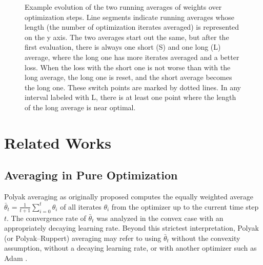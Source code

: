 \documentclass[twocolumn]{article}
\begin{document}
\begin{figure}
\centering
{}
\caption[Example evolution of the two running averages of weights over optimization steps.]{Example evolution of the two running averages of weights over optimization steps.
Line segments indicate running averages whose length (the number of optimization iterates averaged) is represented on the y axis.
The two averages start out the same, but after the first evaluation, there is always one short (S) and one long (L) average, where the long one has more iterates averaged and a better loss.
When the loss with the short one is not worse than with the long average, the long one is reset, and the short average becomes the long one.
These switch points are marked by dotted lines.
In any interval labeled with L, there is at least one point where the length of the long average is near optimal.}
\label{fig:schematic}
\end{figure}


\section{Related Works}

\subsection{Averaging in Pure Optimization}

Polyak averaging as originally proposed \citep{ruppert1988efficient,polyak1992acceleration} computes the equally weighted average
$\bar{\theta}_t = \frac{1}{t+1}\sum_{i=0}^{t}\theta_i$
of all iterates $\theta_i$ from the optimizer up to the current time step $t$.
The convergence rate of $\bar{\theta}_t$ was analyzed in the convex case with an appropriately decaying learning rate.
Beyond this strictest interpretation, Polyak (or Polyak--Ruppert) averaging may refer to using $\bar{\theta}_t$ without the convexity assumption, without a decaying learning rate, or with another optimizer such as Adam \citep{kingma2014adam}.
\end{document}
